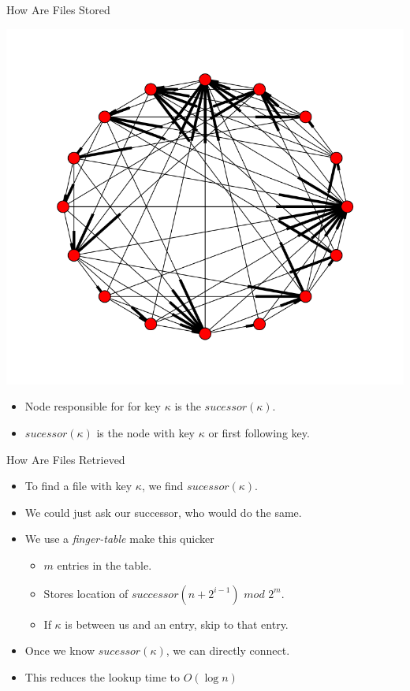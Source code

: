 \documentclass{beamer}
\begin{document}
\begin{frame}{How Are Files Stored}
\begin{center}\includegraphics[scale=0.25]{chordreal}\end{center}
	\begin{itemize}
		\item Node responsible for for key $\kappa$ is the $sucessor(\kappa)$.
		\item $sucessor(\kappa)$ is the node with key $\kappa$ or first following key.
	\end{itemize}

\end{frame}


\begin{frame}{How Are Files Retrieved}
	\begin{itemize}
		\item To find a file with key $\kappa$, we find $sucessor(\kappa)$.
		\item We could just ask our successor, who would do the same.
		\item We use a \emph{finger-table} make this quicker
		\begin{itemize}
			\item $m$ entries in the table.
			\item Stores location of $successor(n+2^{i-1})$ $mod$ $2^m$.
			\item If $\kappa$ is between us and an entry, skip to that entry.
		\end{itemize}
		\item Once we know $sucessor(\kappa)$, we can directly connect.
		\item This reduces the lookup time to $O(\log n)$
	\end{itemize}

\end{frame}
\end{document}
